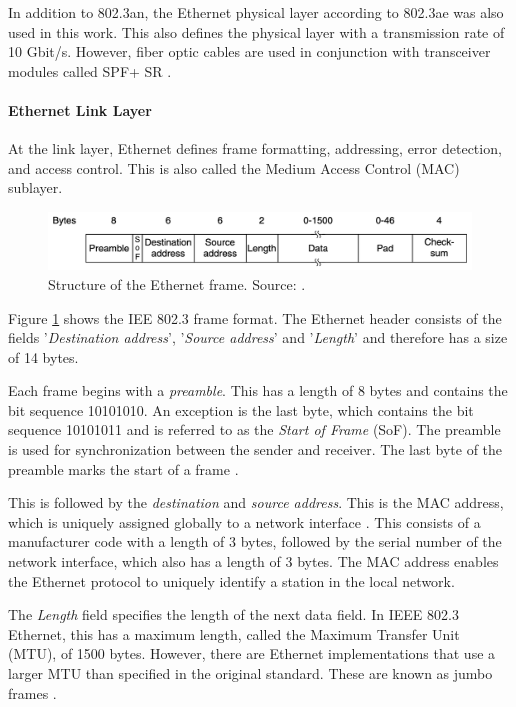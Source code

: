 In addition to 802.3an, the Ethernet physical layer according to 802.3ae was also used in this work. This also defines the physical layer with a transmission rate of 10 Gbit/s. However, fiber optic cables are used in conjunction with transceiver modules called SPF+ SR \cite{10GigabitEthernet}.

\paragraph{Ethernet Link Layer} \label{chap:EthLinkLayer}
At the link layer, Ethernet defines frame formatting, addressing, error detection, and access control. This is also called the Medium Access Control (MAC) sublayer.

\begin{figure}[h]
    \centering
    \includegraphics[width=1\linewidth]{figures/tcpip_refmodel/image5.png}
    \caption[Structure of the Ethernet frame]{Structure of the Ethernet frame. Source: \cite{Tanenbaum2010}.}
    \label{fig:EthernetFrame}
\end{figure}

Figure \ref{fig:EthernetFrame} shows the IEE 802.3 frame format. The Ethernet header consists of the fields '\textit{Destination address}', '\textit{Source address}' and '\textit{Length}' and therefore has a size of 14 bytes.

Each frame begins with a \textit{preamble}. This has a length of 8 bytes and contains the bit sequence 10101010. An exception is the last byte, which contains the bit sequence 10101011 and is referred to as the \textit{Start of Frame} (SoF). The preamble is used for synchronization between the sender and receiver. The last byte of the preamble marks the start of a frame \cite{Tanenbaum2010}.

This is followed by the \textit{destination} and \textit{source address}. This is the MAC address, which is uniquely assigned globally to a network interface \cite{Weigel2021}. This consists of a manufacturer code with a length of 3 bytes, followed by the serial number of the network interface, which also has a length of 3 bytes. The MAC address enables the Ethernet protocol to uniquely identify a station in the local network.

The \textit{Length} field specifies the length of the next data field. In IEEE 802.3 Ethernet, this has a maximum length, called the Maximum Transfer Unit (MTU), of 1500 bytes. However, there are Ethernet implementations that use a larger MTU than specified in the original standard. These are known as jumbo frames \cite{EthernetJumboFrames2009}.

